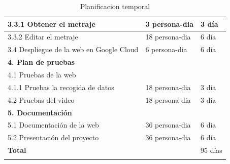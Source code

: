 \documentclass{report}
\begin{document}
\begin{center}
\begin{longtable}{|p{7cm}|p{3cm}|p{3cm}|}
                \hline
                3.3.1 Obtener el metraje & 3 persona-dia & 3 día\\
                \hline
                3.3.2 Editar el metraje & 18 persona-dia & 6 día\\
                \hline
                3.4 Despliegue de la web en Google Cloud & 6 persona-dia & 6 día\\
                \hline
                \textbf{4. Plan de pruebas} &  & \\
                \hline
                4.1 Pruebas de la web & & \\
                \hline
                4.1.1 Pruebas la recogida de datos & 18 persona-dia & 3 día\\
                \hline
                4.2 Pruebas del video & 18 persona-dia & 3 día\\
                \hline
                \textbf{5. Documentación} &  & \\
                \hline
                5.1 Documentación de la web & 36 persona-dia & 6 día\\
                \hline
                5.2 Presentación del proyecto & 36 persona-dia & 6 día\\
                \hline
                \hline
                \textbf{Total} &  & 95 días\\
                \hline
                \caption{Planificacion temporal}
            \end{longtable}
        \end{center}
\end{document}
